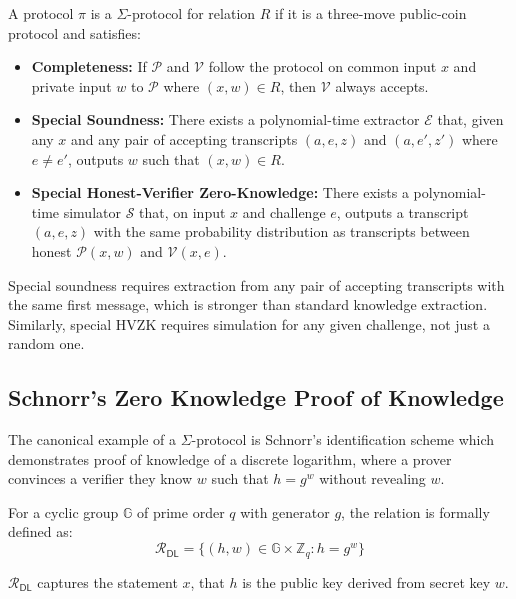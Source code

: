 \begin{definition}
A protocol $\pi$ is a $\Sigma$-protocol for relation $R$ if it is a three-move public-coin protocol and satisfies:
\begin{itemize}
    \item \textbf{Completeness:} If $\mathcal{P}$ and $\mathcal{V}$ follow the protocol on common input $x$ and private input $w$ to $\mathcal{P}$ where $(x,w) \in R$, then $\mathcal{V}$ always accepts.
    
    \item \textbf{Special Soundness:} There exists a polynomial-time extractor $\mathcal{E}$ that, given any $x$ and any pair of accepting transcripts $(a,e,z)$ and $(a,e',z')$ where $e \neq e'$, outputs $w$ such that $(x,w) \in R$.
    
    \item \textbf{Special Honest-Verifier Zero-Knowledge:} There exists a polynomial-time simulator $\mathcal{S}$ that, on input $x$ and challenge $e$, outputs a transcript $(a,e,z)$ with the same probability distribution as transcripts between honest $\mathcal{P}(x,w)$ and $\mathcal{V}(x,e)$.
\end{itemize}
\end{definition}


\noindent Special soundness requires extraction from any pair of accepting transcripts with the same first message, which is stronger than standard knowledge extraction. Similarly, special HVZK requires simulation for any given challenge, not just a random one.


\subsection{Schnorr's Zero Knowledge Proof of Knowledge}
The canonical example of a $\Sigma$-protocol is Schnorr's identification scheme which demonstrates proof of knowledge of a discrete logarithm, where a prover convinces a verifier they know $w$ such that $h = g^w$ without revealing $w$.

\noindent For a cyclic group $\mathbb{G}$ of prime order $q$ with generator $g$, the relation is formally defined as:
\[
    \mathcal{R}_{\mathsf{DL}} = \{(h,w) \in \mathbb{G} \times \mathbb{Z}_q : h = g^w\}
\]

\noindent $\mathcal{R}_{\mathsf{DL}}$ captures the statement $x$, that $h$ is the public key derived from secret key $w$.

